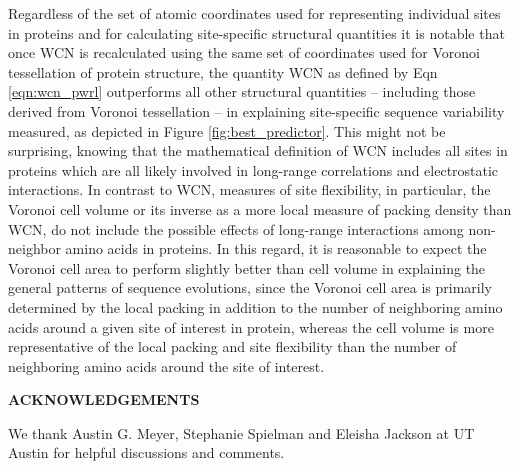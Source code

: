 \documentclass[11pt]{article}
\def\Acknowledgements{\bigskip  \bigskip \begin{center} \begin{large}
             \bf ACKNOWLEDGEMENTS \end{large}\end{center}}
\begin{document}
        Regardless of the set of atomic coordinates used for representing individual sites in proteins and for calculating site-specific structural quantities it is notable that once WCN is recalculated using the same set of coordinates used for Voronoi tessellation of protein structure, the quantity WCN as defined by Eqn \ref{eqn:wcn_pwrl} outperforms all other structural quantities --  including those derived from Voronoi tessellation -- in explaining site-specific sequence variability measured, as depicted in Figure \ref{fig:best_predictor}. This might not be surprising, knowing that the mathematical definition of WCN includes all sites in proteins which are all likely involved in long-range correlations and electrostatic interactions. In contrast to WCN, measures of site flexibility, in particular, the Voronoi cell volume or its inverse as a more local measure of packing density than WCN, do not include the possible effects of long-range interactions among non-neighbor amino acids in proteins. In this regard, it is reasonable to expect the Voronoi cell area to perform slightly better than cell volume in explaining the general patterns of sequence evolutions, since the Voronoi cell area is primarily determined by the local packing in addition to the number of neighboring amino acids around a given site of interest in protein, whereas the cell volume is more representative of the local packing and site flexibility than the number of neighboring amino acids around the site of interest.





\Acknowledgements

We thank Austin G. Meyer, Stephanie Spielman and Eleisha Jackson at UT Austin for helpful discussions and comments.




\end{document}
